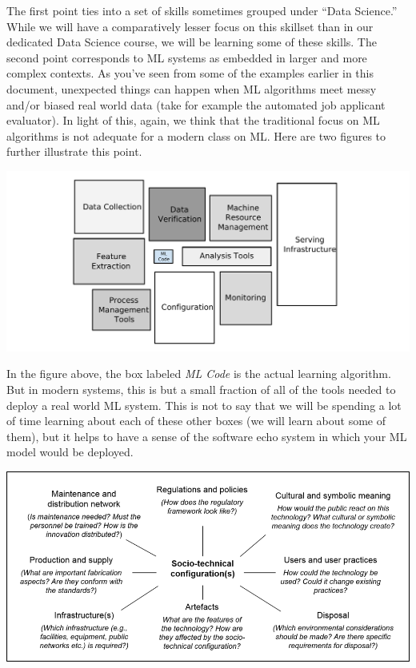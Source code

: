 \documentclass[assignment01_Solutions]{subfiles}
\begin{document}
The first point ties into a set of skills sometimes grouped under ``Data Science.''  While we will have a comparatively lesser focus on this skillset than in our dedicated Data Science course, we will be learning some of these skills.  The second point corresponds to ML systems as embedded in larger and more complex contexts.  As you've seen from some of the examples earlier in this document, unexpected things can happen when ML algorithms meet messy and/or biased real world data (take for example the automated job applicant evaluator).  In light of this, again, we think that the traditional focus on ML algorithms is not adequate for a modern class on ML.  Here are two figures to further illustrate this point.


\begin{center}
\includegraphics[width=.6\linewidth]{figures/MlSystem}
\end{center}
In the figure above, the box labeled \emph{ML Code} is the actual learning algorithm.  But in modern systems, this is but a small fraction of all of the tools needed to deploy a real world ML system.  This is not to say that we will be spending a lot of time learning about each of these other boxes (we will learn about some of them), but it helps to have a sense of the software echo system in which your ML model would be deployed.

\begin{center}
\includegraphics[width=\linewidth]{figures/sociotechnical}
\end{center}
\end{document}
